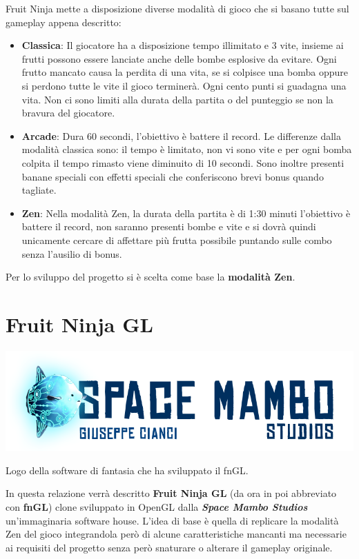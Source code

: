 Fruit Ninja mette a disposizione diverse modalità di gioco che si basano tutte sul gameplay appena descritto:
\begin{itemize}
\item \textbf{Classica}: Il giocatore ha a disposizione tempo illimitato e 3 vite, insieme ai frutti possono essere lanciate anche delle bombe esplosive da evitare. Ogni frutto mancato causa la perdita di una vita, se si colpisce una bomba oppure si perdono tutte le vite il gioco terminerà. Ogni cento punti si guadagna una vita. Non ci sono limiti alla durata della partita o del punteggio se non la bravura del giocatore.
\item \textbf{Arcade}: Dura 60 secondi, l'obiettivo è battere il record. Le differenze dalla modalità classica sono: il tempo è limitato, non vi sono vite e per ogni bomba colpita il tempo rimasto viene diminuito di 10 secondi. Sono inoltre presenti banane speciali con effetti speciali che conferiscono brevi bonus quando tagliate.
\item \textbf{Zen}: Nella modalità Zen, la durata della partita è di 1:30 minuti l'obiettivo è battere il record, non saranno presenti bombe e vite e si dovrà quindi unicamente cercare di affettare più frutta possibile puntando sulle combo senza l'ausilio di bonus. 
\end{itemize}
Per lo sviluppo del progetto si è scelta come base la \textbf{modalità Zen}.





\section{Fruit Ninja GL}
\begin{marginfigure}
	\includegraphics[width=\linewidth]{images/ch10/6}
	\caption{Logo della software di fantasia che ha sviluppato il fnGL.}
\end{marginfigure}
In questa relazione verrà descritto \textbf{Fruit Ninja GL} (da ora in poi abbreviato con \textbf{fnGL}) clone sviluppato in OpenGL dalla \textbf{\textit{Space Mambo Studios}} un'immaginaria software house. L'idea di base è quella di replicare la modalità Zen del gioco integrandola però di alcune caratteristiche mancanti ma necessarie ai requisiti del progetto senza però snaturare o alterare il gameplay originale.

